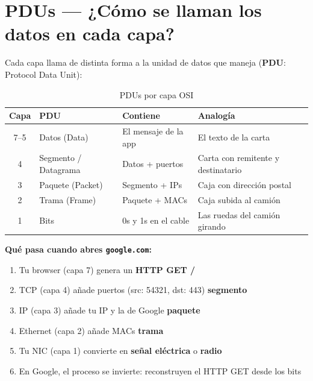 \section{ PDUs --- ¿Cómo se llaman los datos en cada capa?}

Cada capa llama de distinta forma a la unidad de datos que maneja
(\textbf{PDU}: Protocol Data Unit):

\begin{table}[h!]
\centering
\renewcommand{\arraystretch}{1.3}
\begin{tabular}{clll}
\toprule
\textbf{Capa} & \textbf{PDU} & \textbf{Contiene} & \textbf{Analogía} \\
\midrule
7--5 & Datos (Data)            & El mensaje de la app    & El texto de la carta \\
4    & Segmento / Datagrama    & Datos + puertos         & Carta con remitente y destinatario \\
3    & Paquete (Packet)        & Segmento + IPs          & Caja con dirección postal \\
2    & Trama (Frame)           & Paquete + MACs          & Caja subida al camión \\
1    & Bits                    & 0s y 1s en el cable     & Las ruedas del camión girando \\
\bottomrule
\end{tabular}
\caption{PDUs por capa OSI}
\end{table}

\begin{ejemplo}
\textbf{Qué pasa cuando abres \texttt{google.com}:}
\begin{enumerate}
    \item Tu browser (capa 7) genera un \textbf{HTTP GET /}
    \item TCP (capa 4) añade puertos (src: 54321, dst: 443) \textrightarrow{} \textbf{segmento}
    \item IP (capa 3) añade tu IP y la de Google \textrightarrow{} \textbf{paquete}
    \item Ethernet (capa 2) añade MACs \textrightarrow{} \textbf{trama}
    \item Tu NIC (capa 1) convierte en \textbf{señal eléctrica} o \textbf{radio}
    \item En Google, el proceso se invierte: reconstruyen el HTTP GET desde los bits
\end{enumerate}
\end{ejemplo}

